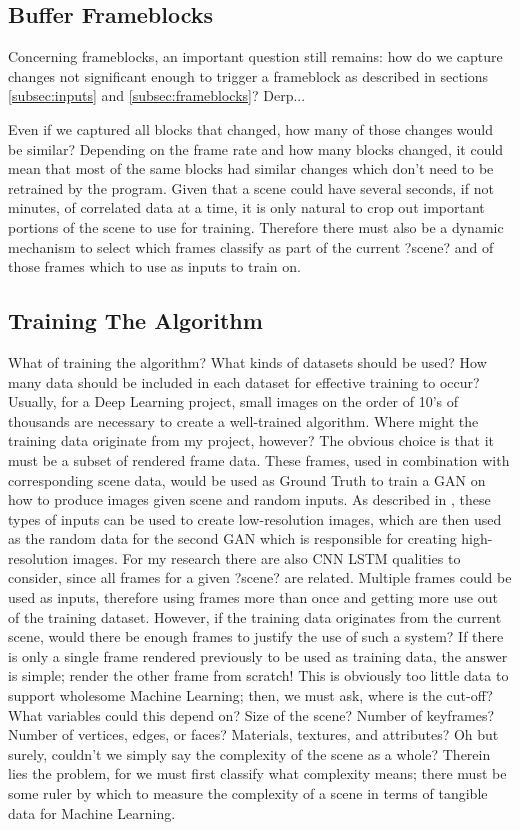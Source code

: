 \documentclass[conference]{IEEEtran}
\begin{document}
\subsection{Buffer Frameblocks}
\label{subsec:buffer_frameblocks}
Concerning frameblocks, an important question still remains:
how do we capture changes not significant enough to trigger a frameblock as
described in sections \ref{subsec:inputs} and \ref{subsec:frameblocks}?
Derp...

Even if we captured all blocks that changed, how many of those changes would be similar?
Depending on the frame rate and how many blocks changed,
it could mean that most of the same blocks had similar changes which don't need to be retrained by the program.
Given that a scene could have several seconds, if not minutes, of correlated data at a time,
it is only natural to crop out important portions of the scene to use for training.
Therefore there must also be a dynamic mechanism to select which frames classify as part of the current ?scene? and of those frames which to use as inputs to train on.


\subsection{Training The Algorithm}
\label{subsec:training_the_algorithm}
What of training the algorithm? What kinds of datasets should be used?
How many data should be included in each dataset for effective training to occur?
Usually, for a Deep Learning project, small images on the order of 10's of thousands are necessary to create a well-trained algorithm.
Where might the training data originate from my project, however?
The obvious choice is that it must be a subset of rendered frame data.
These frames, used in combination with corresponding scene data,
would be used as Ground Truth to train a GAN on how to produce images given scene and random inputs.
As described in \cite{ref:pose}, these types of inputs can be used to create low-resolution images,
which are then used as the random data for the second GAN which is responsible for creating high-resolution images.
For my research there are also CNN LSTM qualities to consider,
since all frames for a given ?scene? are related.
Multiple frames could be used as inputs,
therefore using frames more than once and getting more use out of the training dataset.
However, if the training data originates from the current scene,
would there be enough frames to justify the use of such a system?
If there is only a single frame rendered previously to be used as training data, the answer is simple;
render the other frame from scratch! This is obviously too little data to support wholesome Machine Learning;
then, we must ask, where is the cut-off? What variables could this depend on?
Size of the scene? Number of keyframes? Number of vertices, edges, or faces?
Materials, textures, and attributes? Oh but surely,
couldn't we simply say the complexity of the scene as a whole?
Therein lies the problem, for we must first classify what complexity means;
there must be some ruler by which to measure the complexity of a scene in terms of tangible data for Machine Learning.
\end{document}

